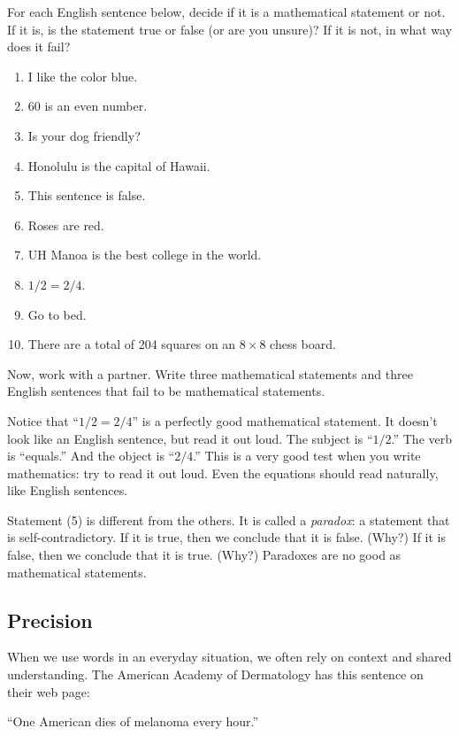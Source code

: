 \begin{thinkpair*}
For each English sentence below, decide if it is a mathematical statement or not.  If it is, is the statement true or false (or are you unsure)?  If it is not, in what way does it fail?

\begin{enumerate}
\item
I like the color blue.
\item
$60$ is an even number.
\item
Is your dog friendly?
\item
Honolulu is the capital of Hawaii.
\item
This sentence is false.
\item
Roses are red.
\item
UH Manoa is the best college in the world.
\item
$1/2 = 2/4$.
\item
Go to bed.
\item
There are a total of 204 squares on an $8 \times 8$ chess board.
\end{enumerate}

Now, work with a partner.  Write three mathematical statements and three English sentences that fail to be mathematical statements.
\end{thinkpair*}

Notice that ``$1/2 = 2/4$'' is a perfectly good mathematical statement.  It doesn't look like an English sentence, but read it out loud.  The subject is ``$1/2$.'' The verb is ``equals.''  And the object is ``$2/4$.''  This is a very good test when you write mathematics: try to read it out loud.  Even the equations should read naturally, like English sentences. 

Statement (5) is different from the others.  It is called a \emph{paradox}: a statement that is self-contradictory.  If it is true, then we conclude that it is false.  (Why?)  If it is false, then we conclude that it is true.  (Why?)  Paradoxes are no good as mathematical statements.  

\subsection{Precision}
When we use words in an everyday situation, we often rely on context and shared understanding.
The American Academy of Dermatology has this sentence on their web page: 
\begin{center}
``One American dies of melanoma every hour.''
\end{center}

